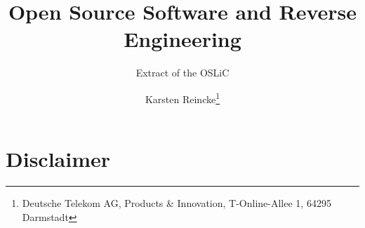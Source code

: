 \documentclass[DIV=calc,BCOR=5mm,12pt,headings=small,oneside,toc=bib]{scrbook}
\begin{document}
\nocite{*}

\titlehead{Version 1.0}

\subject{\small \itshape How to Achieve Open Source License Compliance} 

\title{Open Source Software and Reverse Engineering}

\subtitle{Extract of the OSLiC} \author{
Karsten Reincke\thanks{Deutsche Telekom AG, Products \& Innovation, 
T-Online-Allee 1, 64295 Darmstadt}
}

\maketitle


\normalsize

\section*{Disclaimer}






\footnotesize


\printnomenclature


\end{document}
